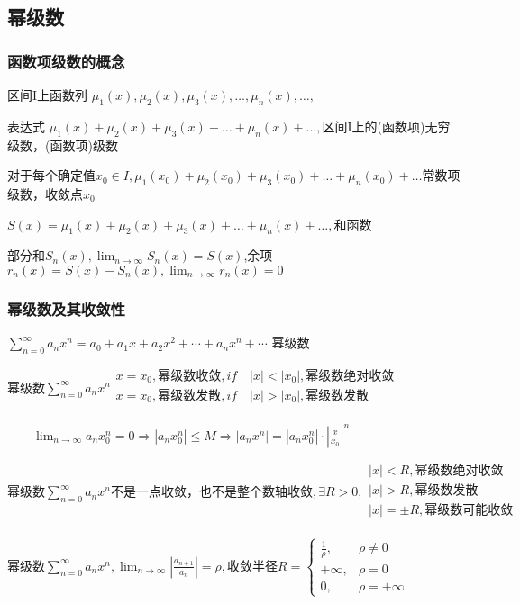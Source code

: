\documentclass[UTF8]{ctexart}
\newcommand{\mt}[1]{\text{#1}}
\newcommand{\md}[1]{\displaystyle{#1}}
\newcommand{\mda}[1]{$\displaystyle{ #1 }$}
\newcommand{\mf}[1]{\left( #1\right)}
\newcommand{\mfa}[1]{\left| #1\right|}
\newcommand{\q}{\quad}
\newcommand{\ma}[1]{\begin{array}{llll} #1 \end{array}}
\newcommand{\fcz}[1] {
    \left\{
        \begin{array}{llll} #1 \end{array}
    \right.
}
\newcommand{\jisu}[1]{\sum_{n=0}^\infty #1}
\newcommand{\jixian}[1]{\lim_{n \rightarrow \infty} #1}
\begin{document}
\newpage
\subsection{幂级数}

\subsubsection{函数项级数的概念}


区间I上函数列 $\mu_1\mf{x},\mu_2\mf{x},\mu_3\mf{x} ,\dots,\mu_n\mf{x},\dots,$

表达式 $\mu_1\mf{x}+\mu_2\mf{x}+\mu_3\mf{x} +\dots+\mu_n\mf{x}+\dots,$区间I上的(函数项)无穷级数，(函数项)级数


对于每个确定值$x_0 \in I,\mu_1\mf{x_0}+\mu_2\mf{x_0}+\mu_3\mf{x_0} +\dots+\mu_n\mf{x_0}+\dots$常数项级数，收敛点$x_0$

$S\mf{x}=\mu_1\mf{x}+\mu_2\mf{x}+\mu_3\mf{x} +\dots+\mu_n\mf{x}+\dots,$和函数

部分和$S_n\mf{x},\lim_{n \rightarrow \infty}S_n\mf{x}=S\mf{x}$,余项$r_n\mf{x}=S\mf{x}-S_n\mf{x},\lim_{n \rightarrow \infty}r_n\mf{x}=0$


\subsubsection{幂级数及其收敛性}

\mda{\jisu{a_n x^n}=a_0+a_1x+a_2x^2+\cdots+a_nx^n+\cdots} 幂级数


\mda{\mt{幂级数}\jisu{a_nx^n}\ma{
    x=x_0,\mt{幂级数收敛}, if \q \mfa{x}<\mfa{x_0},\mt{幂级数绝对收敛}\\
    x=x_0,\mt{幂级数发散}, if \q \mfa{x}>\mfa{x_0},\mt{幂级数发散}\\
}}

$\q \q \md{\jixian{a_nx_0^n}=0 \Rightarrow \mfa{a_nx_0^n}\leqslant M \Rightarrow \mfa{a_nx^n}=\mfa{a_nx_0^n}\cdot \mfa{\frac{x}{x_0}}^n}$


$\mt{幂级数}\jisu{a_nx^n} \mt{不是一点收敛，也不是整个数轴收敛},\exists R>0,\ma{
    \mfa{x}<R,\mt{幂级数绝对收敛}\\
    \mfa{x}>R,\mt{幂级数发散}\\
    \mfa{x}=\pm R,\mt{幂级数可能收敛}\\
}$

$\mt{幂级数}\jisu{a_nx^n},\jixian{\mfa{\frac{a_{n+1}}{a_n}}}=\rho,\mt{收敛半径}R=\fcz{
    \frac{1}{\rho},&\rho \neq 0\\
    +\infty, &\rho =0\\
    0, &\rho=+\infty
}$
\end{document}
